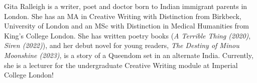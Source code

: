 Gita Ralleigh is a writer, poet and doctor born to Indian immigrant parents in London. She has an MA in Creative Writing with Distinction from Birkbeck, University of London and an MSc with Distinction in Medical Humanities from King’s College London. She has written poetry books (\emph{A Terrible Thing (2020)}, \emph{Siren (2022)}), and her debut novel for young readers, \emph{The Destiny of Minou Moonshine (2023)}, is a story of a Queendom set in an alternate India. Currently, she is a lecturer for the undergraduate Creative Writing module at Imperial College London!